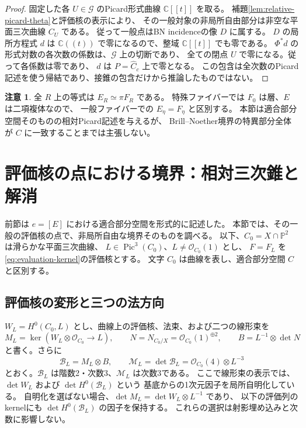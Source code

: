 \documentclass[a4paper,11pt]{ltjsarticle}
\theoremstyle{definition}
\newtheorem{remark}[theorem]{注意}
\newcommand{\CC}{\mathbb C}
\newcommand{\OO}{\mathcal O}
\newcommand{\PP}{\mathbb P}
\newcommand{\Pic}{\operatorname{Pic}}
\begin{document}
\begin{proof}
固定した各 $U\in\mathcal G$ のPicard形式曲線 $\CC[[t]]$ を取る。
補題\ref{lem:relative-picard-theta}と評価核の表示により、
その一般対象の非局所自由部分は非空な平面三次曲線 $C_U$ である。
従って一般点はBN incidenceの像 $D$ に属する。
$D$ の局所方程式 $d$ は $\CC((t))$ で零になるので、整域 $\CC[[t]]$ でも零である。
$\Phi^*d$ の形式対数の各次数の係数は、$\mathcal G$ 上の切断であり、
全ての閉点 $U$ で零になる。従って各係数は零であり、
$d$ は $P=\widehat C_c$ 上で零となる。
この包含は全次数のPicard記述を使う帰結であり、接錐の包含だけから推論したものではない。
\end{proof}

\begin{remark}
全 $R$ 上の等式は $E_R\simeq\pi F_R$ である。
特殊ファイバーでは $F_0$ は層、$E$ は二項複体なので、
一般ファイバーでの $E_\eta=F_\eta$ と区別する。
本節は適合部分空間そのものの相対Picard記述を与えるが、
Brill--Noether境界の特異部分全体が $C$ に一致することまでは主張しない。
\end{remark}

\section{評価核の点における境界：相対三次錐と解消}
\label{sec:local-bn-cubic}

前節は $e=[E]$ における適合部分空間を形式的に記述した。
本節では、その一般の評価核の点で、非局所自由な境界そのものを調べる。
以下、$C_0=X\cap\PP^2$ は滑らかな平面三次曲線、
$L\in\Pic^3(C_0)$、$L\ne\OO_{C_0}(1)$ とし、
$F=F_L$ を\eqref{eq:evaluation-kernel}の評価核とする。
文字 $C_0$ は曲線を表し、適合部分空間 $C$ と区別する。

\subsection{評価核の変形と三つの法方向}

$W_L=H^0(C_0,L)$ とし、曲線上の評価核、法束、および二つの線形束を
\[
 M_L=\ker(W_L\otimes\OO_{C_0}\to L),\qquad
 N=N_{C_0/X}=\OO_{C_0}(1)^{\oplus2},\qquad
 B=L^{-1}\otimes\det N
\]
と書く。さらに
\begin{equation}\label{eq:local-bn-bundle}
 \mathcal B_L=M_L\otimes B,\qquad
 \mathcal M_L=\det\mathcal B_L=\OO_{C_0}(4)\otimes L^{-3}
\end{equation}
とおく。$\mathcal B_L$ は階数2・次数3、$\mathcal M_L$ は次数3である。
ここで線形束の表示では、$\det W_L$ および $\det H^0(\mathcal B_L)$ という
基底からの1次元因子を局所自明化している。
自明化を選ばない場合、$\det M_L=\det W_L\otimes L^{-1}$ であり、
以下の評価列のkernelにも $\det H^0(\mathcal B_L)$ の因子を保持する。
これらの選択は射影埋め込みと次数に影響しない。
\end{document}
